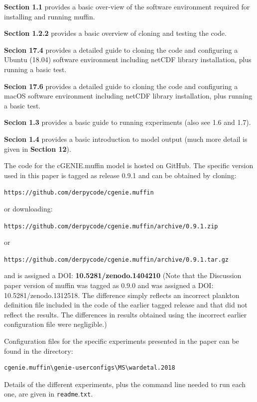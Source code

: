 \documentclass[gmd, manuscript]{copernicus}
\begin{document}
{\noindent
\textbf{Section 1.1} provides a basic over-view of the software environment required for installing and running muffin.

\noindent
\textbf{Section 1.2.2} provides a basic overview of cloning and testing the code.

\noindent
\textbf{Secion 17.4} provides a detailed guide to cloning the code and configuring a Ubuntu (18.04) software environment including netCDF library installation, plus running a basic test.

\noindent
\textbf{Secion 17.6} provides a detailed guide to cloning the code and configuring a macOS software environment including netCDF library installation, plus running a basic test.

\noindent
\textbf{Secion 1.3} provides a basic guide to running experiments (also see 1.6 and 1.7).

\noindent
\textbf{Secion 1.4} provides a basic introduction to model output (much more detail is given in \textbf{Section 12}).


The code for the cGENIE.muffin model is hosted on GitHub. The specific version used in this paper is tagged as release 0.9.1 and can be obtained by cloning:

\texttt{https://github.com/derpycode/cgenie.muffin}

\noindent or downloading: 

\texttt{https://github.com/derpycode/cgenie.muffin/archive/0.9.1.zip}

\noindent or

\texttt{https://github.com/derpycode/cgenie.muffin/archive/0.9.1.tar.gz}

\noindent and is assigned a DOI: \textbf{10.5281/zenodo.1404210} (Note that the Discussion paper version of muffin was tagged as 0.9.0 and was assigned a DOI: 10.5281/zenodo.1312518. The difference simply reflects an incorrect plankton definition file included in the code of the earlier tagged release and that did not reflect the results. The differences in results obtained using the incorrect earlier configuration file were negligible.)

\noindent Configuration files for the specific experiments presented in the paper can be found in the directory: 

\begin{verbatim}
cgenie.muffin\genie-userconfigs\MS\wardetal.2018
\end{verbatim}

\noindent Details of the different experiments, plus the command line needed to run each one, are given in \texttt{readme}.\texttt{txt}.

}
\end{document}
